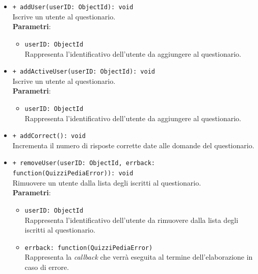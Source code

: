 \begin{itemize}
\begin{itemize}
			\item \texttt{+ addUser(userID: ObjectId): void}\\
			Iscrive un utente al questionario.\\
			\textbf{Parametri}:
			\begin{itemize}
				\item \texttt{userID: ObjectId}\\
				Rappresenta l'identificativo dell'utente da aggiungere al questionario.
			\end{itemize}
			
			\item \texttt{+ addActiveUser(userID: ObjectId): void}\\
			Iscrive un utente al questionario.\\
			\textbf{Parametri}:
			\begin{itemize}
				\item \texttt{userID: ObjectId}\\
				Rappresenta l'identificativo dell'utente da aggiungere al questionario.
			\end{itemize}
			
			\item \texttt{+ addCorrect(): void}\\
			Incrementa il numero di risposte corrette date alle domande del questionario.\\			
			
			\item \texttt{+ removeUser(userID: ObjectId, errback: function(QuizziPediaError)): void}\\
			Rimuovere un utente dalla lista degli iscritti al questionario.\\
			\textbf{Parametri}:
			\begin{itemize}
				\item \texttt{userID: ObjectId}\\
				Rappresenta l'identificativo dell'utente da rimuovere dalla lista degli iscritti al questionario.
				\item \texttt{errback: function(QuizziPediaError)}\\
				Rappresenta la \textit{callback} che verrà eseguita al termine dell'elaborazione in caso di errore.
			\end{itemize}
			

\end{itemize}
\end{itemize}

